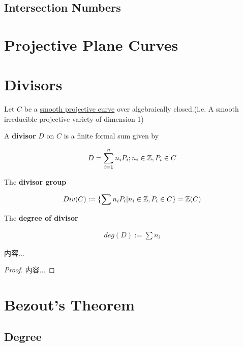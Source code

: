 \documentclass[Total.tex]{subfiles}
\begin{document}
				\subsection{Intersection Numbers}
			\section{Projective Plane Curves}
			
			\section{Divisors}
				
				\begin{Def}
					Let $C$ be a \underline{smooth projective curve} over algebraically closed.(i.e. A smooth irreducible projective variety of dimension 1)
					
					A \textbf{divisor} $D$ on $C$ is a finite formal sum given by
					
					\begin{gather*}
						D=\sum_{i=1}^n n_i P_i;n_i\in \mathbb{Z}, P_i\in C
					\end{gather*} 
					
					The \textbf{divisor group}
					
					\begin{gather*}
						Div(C):=\{\sum n_i P_i|n_i\in \mathbb{Z},P_i\in C\}=\mathbb{Z}(C)
					\end{gather*}
					
					The \textbf{degree of divisor}
					
					\begin{gather*}
						deg(D):=\sum n_i
					\end{gather*}
				\end{Def} 
				
				\begin{lemma}
					内容...
				\end{lemma}
				
				\begin{proof}
					内容...
				\end{proof}
			
			\section{Bezout's Theorem}
			
				\subsection{Degree}
				
\end{document}
